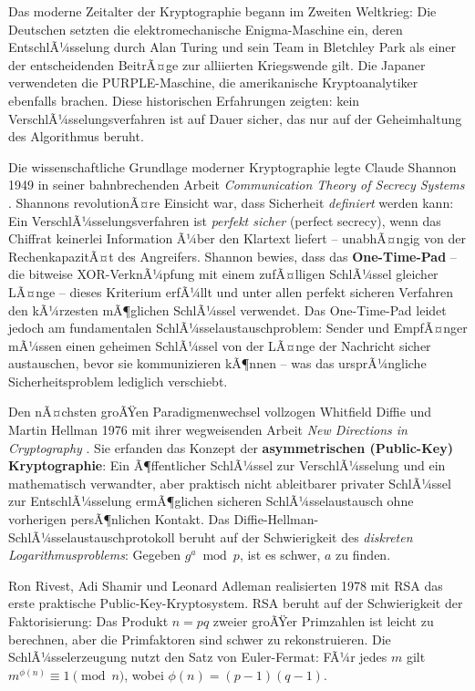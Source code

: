 ﻿\documentclass[a4paper,12pt]{scrreprt}
\theoremstyle{definition}
\begin{document}
Das moderne Zeitalter der Kryptographie begann im Zweiten Weltkrieg: Die Deutschen setzten die elektromechanische Enigma-Maschine ein, deren EntschlÃ¼sselung durch Alan Turing und sein Team in Bletchley Park als einer der entscheidenden BeitrÃ¤ge zur alliierten Kriegswende gilt. Die Japaner verwendeten die PURPLE-Maschine, die amerikanische Kryptoanalytiker ebenfalls brachen. Diese historischen Erfahrungen zeigten: kein VerschlÃ¼sselungsverfahren ist auf Dauer sicher, das nur auf der Geheimhaltung des Algorithmus beruht.

Die wissenschaftliche Grundlage moderner Kryptographie legte Claude Shannon 1949 in seiner bahnbrechenden Arbeit \textit{Communication Theory of Secrecy Systems} \cite{Sha49}. Shannons revolutionÃ¤re Einsicht war, dass Sicherheit \emph{definiert} werden kann: Ein VerschlÃ¼sselungsverfahren ist \emph{perfekt sicher} (perfect secrecy), wenn das Chiffrat keinerlei Information Ã¼ber den Klartext liefert -- unabhÃ¤ngig von der RechenkapazitÃ¤t des Angreifers. Shannon bewies, dass das \textbf{One-Time-Pad} \cite{Ver26} -- die bitweise XOR-VerknÃ¼pfung mit einem zufÃ¤lligen SchlÃ¼ssel gleicher LÃ¤nge -- dieses Kriterium erfÃ¼llt und unter allen perfekt sicheren Verfahren den kÃ¼rzesten mÃ¶glichen SchlÃ¼ssel verwendet. Das One-Time-Pad leidet jedoch am fundamentalen SchlÃ¼sselaustauschproblem: Sender und EmpfÃ¤nger mÃ¼ssen einen geheimen SchlÃ¼ssel von der LÃ¤nge der Nachricht sicher austauschen, bevor sie kommunizieren kÃ¶nnen -- was das ursprÃ¼ngliche Sicherheitsproblem lediglich verschiebt.

Den nÃ¤chsten groÃŸen Paradigmenwechsel vollzogen Whitfield Diffie und Martin Hellman 1976 mit ihrer wegweisenden Arbeit \textit{New Directions in Cryptography} \cite{DH76}. Sie erfanden das Konzept der \textbf{asymmetrischen (Public-Key) Kryptographie}: Ein Ã¶ffentlicher SchlÃ¼ssel zur VerschlÃ¼sselung und ein mathematisch verwandter, aber praktisch nicht ableitbarer privater SchlÃ¼ssel zur EntschlÃ¼sselung ermÃ¶glichen sicheren SchlÃ¼sselaustausch ohne vorherigen persÃ¶nlichen Kontakt. Das Diffie-Hellman-SchlÃ¼sselaustauschprotokoll beruht auf der Schwierigkeit des \emph{diskreten Logarithmusproblems}: Gegeben $g^a \bmod p$, ist es schwer, $a$ zu finden.

Ron Rivest, Adi Shamir und Leonard Adleman realisierten 1978 mit RSA \cite{Riv78} das erste praktische Public-Key-Kryptosystem. RSA beruht auf der Schwierigkeit der Faktorisierung: Das Produkt $n = pq$ zweier groÃŸer Primzahlen ist leicht zu berechnen, aber die Primfaktoren sind schwer zu rekonstruieren. Die SchlÃ¼sselerzeugung nutzt den Satz von Euler-Fermat: FÃ¼r jedes $m$ gilt $m^{\phi(n)} \equiv 1 \pmod{n}$, wobei $\phi(n) = (p-1)(q-1)$.
\end{document}
